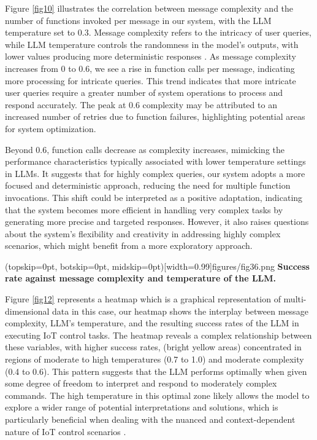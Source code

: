 \documentclass{ieeeaccess}
\begin{document}
Figure \ref{fig10} illustrates the correlation between message complexity and the number of functions invoked per message in our system, with the LLM temperature set to 0.3. Message complexity refers to the intricacy of user queries, while LLM temperature controls the randomness in the model's outputs, with lower values producing more deterministic responses \cite{rum2024setting}. As message complexity increases from 0 to 0.6, we see a rise in function calls per message, indicating more processing for intricate queries. This trend indicates that more intricate user queries require a greater number of system operations to process and respond accurately. The peak at 0.6 complexity may be attributed to an increased number of retries due to function failures, highlighting potential areas for system optimization. 

Beyond 0.6, function calls decrease as complexity increases, mimicking the performance characteristics typically associated with lower temperature settings in LLMs. It suggests that for highly complex queries, our system adopts a more focused and deterministic approach, reducing the need for multiple function invocations. This shift could be interpreted as a positive adaptation, indicating that the system becomes more efficient in handling very complex tasks by generating more precise and targeted responses. However, it also raises questions about the system's flexibility and creativity in addressing highly complex scenarios, which might benefit from a more exploratory approach.

\Figure[t!](topskip=0pt, botskip=0pt,
midskip=0pt)[width=0.99\columnwidth]{{figures/fig36.png}}
{ \textbf{Success rate against message complexity and temperature of the LLM.}\label{fig12}}

Figure \ref{fig12} represents a heatmap which is a graphical representation of multi-dimensional data in this case, our heatmap shows the interplay between message complexity, LLM's temperature, and the resulting success rates of the LLM in executing IoT control tasks. The heatmap reveals a complex relationship between these variables, with higher success rates, (bright yellow areas) concentrated in regions of moderate to high temperatures (0.7 to 1.0) and moderate complexity (0.4 to 0.6). This pattern suggests that the LLM performs optimally when given some degree of freedom to interpret and respond to moderately complex commands. The high temperature in this optimal zone likely allows the model to explore a wider range of potential interpretations and solutions, which is particularly beneficial when dealing with the nuanced and context-dependent nature of IoT control scenarios \cite{10315791}. 
\end{document}
